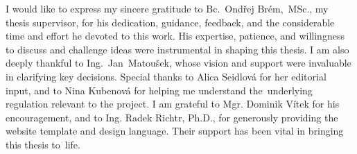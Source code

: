 \documentclass[english,bachelor,twoside]{ctufit-thesis} %
\begin{document}
 
\frontmatter\frontmatterinit %

\thispagestyle{empty}\maketitle\thispagestyle{empty}\cleardoublepage %


\imprintpage %
\stopTOCentries

\begin{acknowledgmentpage}
    I would like to express my sincere gratitude to Bc.~Ondřej Brém,~MSc., my thesis supervisor, for his dedication, guidance, feedback, and the considerable time and effort he devoted to this work. His expertise, patience, and willingness to discuss and challenge ideas were instrumental in shaping this thesis.
    I am also deeply thankful to Ing.~Jan~Matoušek, whose vision and support were invaluable in clarifying key decisions.
    Special thanks to Alica Seidlová for her editorial input, and to Nina Kubenová for helping me understand the~underlying regulation relevant to the project.
    I am grateful to Mgr. Dominik Vítek for his encouragement, and to Ing. Radek Richtr, Ph.D., for generously providing the website template and design language.
    Their support has been vital in bringing this thesis to~life.
\end{acknowledgmentpage} 
\end{document}
